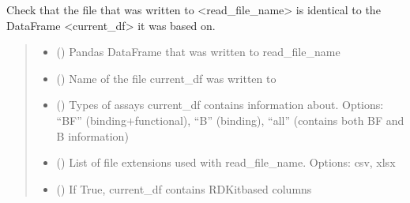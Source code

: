 \documentclass[letterpaper,10pt,english]{sphinxmanual}
\begin{document}
\begin{fulllineitems}
\label{\detokenize{sanity_checks:sanity_checks.test_equality}}
\pysigstartsignatures
{}
\pysigstopsignatures
\sphinxAtStartPar
Check that the file that was written to \textless{}read\_file\_name\textgreater{}
is identical to the DataFrame \textless{}current\_df\textgreater{} it was based on.
\begin{quote}\begin{description}
\begin{itemize}
\item {} 
\sphinxAtStartPar
{} () \textendash{} Pandas DataFrame that was written to read\_file\_name

\item {} 
\sphinxAtStartPar
{} () \textendash{} Name of the file current\_df was written to

\item {} 
\sphinxAtStartPar
{} () \textendash{} Types of assays current\_df contains information about.         Options: “BF” (binding+functional), “B” (binding), “all” (contains both BF and B information)

\item {} 
\sphinxAtStartPar
{} (\sphinxstyleliteralemphasis{\sphinxupquote{{[}}}\sphinxstyleliteralemphasis{\sphinxupquote{{]}}}) \textendash{} List of file extensions used with read\_file\_name. Options: csv, xlsx

\item {} 
\sphinxAtStartPar
{} () \textendash{} If True, current\_df contains RDKit\sphinxhyphen{}based columns

\end{itemize}

\end{description}\end{quote}

\end{fulllineitems}
\end{document}
